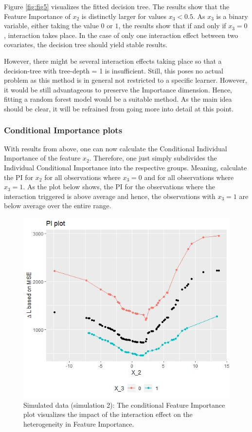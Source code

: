 \documentclass[]{krantz}
\begin{document}
Figure \ref{fig:fig5} visualizes the fitted decision tree. The results
show that the Feature Importance of \(x_2\) is distinctly larger for
values \(x_3 < 0.5\). As \(x_3\) is a binary variable, either taking the
value \(0\) or \(1\), the results show that if and only if \(x_3 = 0\),
interaction takes place. In the case of only one interaction effect
between two covariates, the decision tree should yield stable results.

However, there might be several interaction effects taking place so that
a decision-tree with tree-depth = 1 is insufficient. Still, this poses
no actual problem as this method is in general not restricted to a
specific learner. However, it would be still advantageous to preserve
the Importance dimension. Hence, fitting a random forest model would be
a suitable method. As the main idea should be clear, it will be
refrained from going more into detail at this point.

\subsubsection{Conditional Importance plots}\label{ch322}

With results from above, one can now calculate the Conditional
Individual Importance of the feature \(x_{2}\). Therefore, one just
simply subdivides the Individual Conditional Importance into the
respective groups. Meaning, calculate the PI for \(x_2\) for all
observations where \(x_3 = 0\) and for all observations where
\(x_3 = 1\). As the plot below shows, the PI for the observations where
the interaction triggered is above average and hence, the observations
with \(x_3 = 1\) are below average over the entire range.

\begin{figure}

{\centering \includegraphics[width=0.99\linewidth]{images/03-7-6} 

}

\caption{Simulated data (simulation 2): The conditional Feature Importance plot visualizes the impact of the interaction effect on the heterogeneity in Feature Importance.}\label{fig:fig6}
\end{figure}
\end{document}

